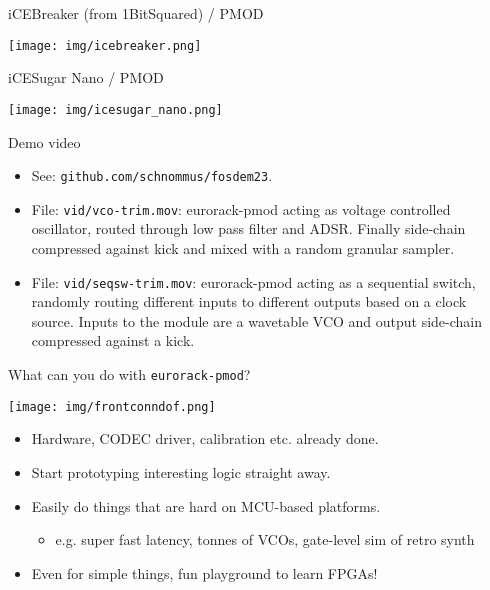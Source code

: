\documentclass[aspectratio=169]{beamer}
\begin{document}
\begin{frame}{iCEBreaker (from 1BitSquared) / PMOD}
    \begin{center}
        \texttt{[image: img/icebreaker.png]}
    \end{center}
\end{frame}

\begin{frame}{iCESugar Nano / PMOD}
\begin{center}
    \texttt{[image: img/icesugar\_nano.png]}
\end{center}
\end{frame}


\begin{frame}{Demo video}
    \begin{itemize}
        \item See: \texttt{github.com/schnommus/fosdem23}.
        \item File: \texttt{vid/vco-trim.mov}: eurorack-pmod acting as voltage controlled oscillator, routed through low pass filter and ADSR. Finally side-chain compressed against kick and mixed with a random granular sampler.
        \item File: \texttt{vid/seqsw-trim.mov}: eurorack-pmod acting as a sequential switch, randomly routing different inputs to different outputs based on a clock source. Inputs to the module are a wavetable VCO and output side-chain compressed against a kick.
    \end{itemize}
\end{frame}



\begin{frame}{What can you do with \texttt{eurorack-pmod}?}
    \begin{center}
        \texttt{[image: img/frontconndof.png]}
    \end{center}
    \begin{itemize}
        \item Hardware, CODEC driver, calibration etc. already done.
        \item Start prototyping interesting logic straight away.
        \item Easily do things that are hard on MCU-based platforms.
            \begin{itemize}
                \item e.g. super fast latency, tonnes of VCOs, gate-level sim of retro synth
            \end{itemize}
        \item Even for simple things, fun playground to learn FPGAs!
    \end{itemize}
\end{frame}
\end{document}
